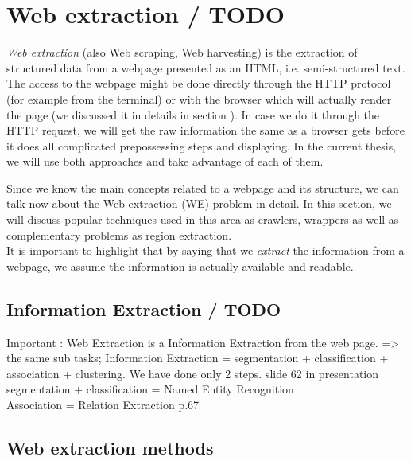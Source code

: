 \chapter{Web extraction / TODO}

\textit{Web extraction} (also Web scraping, Web harvesting) is the extraction of structured data from a webpage presented as an HTML, i.e. semi-structured text. The access to the webpage might be done directly through the HTTP protocol (for example from the terminal) or with the browser which will actually render the page (we discussed it in details in section ). In case we do it through the HTTP request, we will get the raw information the same as a browser gets before it does all complicated prepossessing steps and displaying. In the current thesis, we will use both approaches and take advantage of each of them.

Since we know the main concepts related to a webpage and its structure, we can talk now about the Web extraction (WE) problem in detail. In this section, we will discuss popular techniques used in this area as crawlers, wrappers as well as complementary problems as region extraction.\\

It is important to highlight that by saying that we \textit{extract} the information from a webpage, we assume the information is actually available and readable.


\section{Information Extraction / TODO}

Important : Web Extraction is a Information Extraction from the web page. => the same sub tasks; Information Extraction = segmentation + classification + association + clustering. We have done only 2 steps. slide 62 in presentation \\

segmentation + classification = Named Entity Recognition\\
Association = Relation Extraction p.67\\




\section{Web extraction methods}

